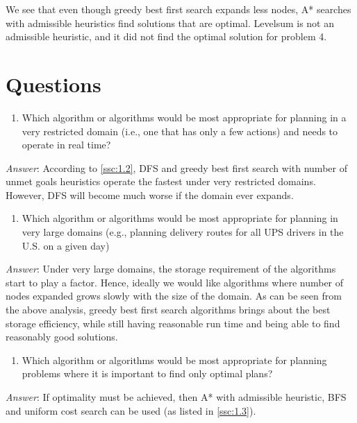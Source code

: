 \documentclass{article}[12pt]
\begin{document}
			We see that even though greedy best first search expands less nodes, A* searches with admissible heuristics find solutions that are optimal. Levelsum is not an admissible heuristic, and it did not find the optimal solution for problem 4.
			
	\section{Questions}
		
		\begin{enumerate}
			\item Which algorithm or algorithms would be most appropriate for planning in a very restricted domain (i.e., one that has only a few actions) and needs to operate in real time?
		\end{enumerate}
	
		\textit{Answer}: According to \ref{ssc:1.2}, DFS and greedy best first search with number of unmet goals heuristics operate the fastest under very restricted domains. However, DFS will become much worse if the domain ever expands.
		
		
		\begin{enumerate}[resume]
			\item Which algorithm or algorithms would be most appropriate for planning in very large domains (e.g., planning delivery routes for all UPS drivers in the U.S. on a given day)
		\end{enumerate}
	
		\textit{Answer}: Under very large domains, the storage requirement of the algorithms start to play a factor. Hence, ideally we would like algorithms where number of nodes expanded grows slowly with the size of the domain. As can be seen from the above analysis, greedy best first search algorithms brings about the best storage efficiency, while still having reasonable run time and being able to find reasonably good solutions.
		
	
		\begin{enumerate}[resume]
			\item Which algorithm or algorithms would be most appropriate for planning problems where it is important to find only optimal plans?
		\end{enumerate}
	
		\textit{Answer}: If optimality must be achieved, then A* with admissible heuristic, BFS and uniform cost search can be used (as listed in \ref{ssc:1.3}). 
	
	
\end{document}
